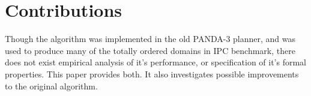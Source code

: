 
\section{Contributions} 
Though the algorithm was implemented in the old PANDA-3 planner, and was used to produce many of the totally ordered domains in IPC benchmark, there does not exist empirical analysis of it's performance, or specification of it's formal properties. This paper provides both.
It also investigates possible improvements to the original algorithm.



